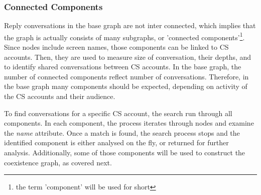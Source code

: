 \documentclass[sigconf]{acmart}
\begin{document}
{%


\subsubsection{Connected Components}

Reply conversations in the base graph are not inter connected, 
which implies that the graph is actually consists of many 
subgraphs, or 'connected components'{\footnote{the term 
'component' will be used for short}}. Since nodes include 
screen names, those components can be linked to CS accounts. Then,  
they are used to measure size of conversation, their
depths, and to identify shared conversations between CS
accounts. In the base graph, the number of connected components 
reflect number of conversations. Therefore, in the base graph 
many components should be expected, depending on activity of the CS
accounts and their audience.

To find conversations for a specific CS account, the search run through all
components. In each component, the process iterates through nodes and 
examine the {\emph{name}} attribute. Once a match is found, the search 
process stops and the identified component is either analysed on the fly, or
returned for further analysis. Additionally, some of those components will 
be used to construct the coexistence graph, as covered next.

}
\end{document}

